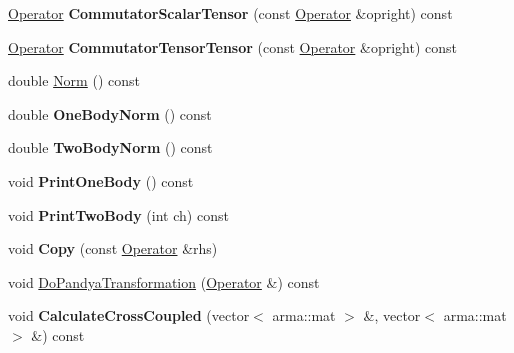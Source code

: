 \begin{DoxyCompactItemize}
\item 
\hypertarget{classOperator_aa6b5af6364735c97aa201851480375c7}{\hyperlink{classOperator}{Operator} {\bfseries Commutator\-Scalar\-Tensor} (const \hyperlink{classOperator}{Operator} \&opright) const }\label{classOperator_aa6b5af6364735c97aa201851480375c7}

\item 
\hypertarget{classOperator_ab5a2d58468b9f4a9f551613f5ce36fd1}{\hyperlink{classOperator}{Operator} {\bfseries Commutator\-Tensor\-Tensor} (const \hyperlink{classOperator}{Operator} \&opright) const }\label{classOperator_ab5a2d58468b9f4a9f551613f5ce36fd1}

\item 
double \hyperlink{classOperator_acb9d7959232a636191b91f6bf5b7b0c8}{Norm} () const 
\item 
\hypertarget{classOperator_a72dc7aea85c7775097d235de6f17f330}{double {\bfseries One\-Body\-Norm} () const }\label{classOperator_a72dc7aea85c7775097d235de6f17f330}

\item 
\hypertarget{classOperator_af1c40bdef64ec9abd5d95e8328565a67}{double {\bfseries Two\-Body\-Norm} () const }\label{classOperator_af1c40bdef64ec9abd5d95e8328565a67}

\item 
\hypertarget{classOperator_a5ec5a8110337108ac31d3af7337e454b}{void {\bfseries Print\-One\-Body} () const }\label{classOperator_a5ec5a8110337108ac31d3af7337e454b}

\item 
\hypertarget{classOperator_a905e42cefafaca0eb155cf41b3cd37b8}{void {\bfseries Print\-Two\-Body} (int ch) const }\label{classOperator_a905e42cefafaca0eb155cf41b3cd37b8}

\item 
\hypertarget{classOperator_a851708e76dd24603d0527f6c5c1bd544}{void {\bfseries Copy} (const \hyperlink{classOperator}{Operator} \&rhs)}\label{classOperator_a851708e76dd24603d0527f6c5c1bd544}

\item 
void \hyperlink{classOperator_a70139e405d99a645f57c37ccd2294c75}{Do\-Pandya\-Transformation} (\hyperlink{classOperator}{Operator} \&) const 
\item 
\hypertarget{classOperator_a4b36a16fac41d3465e9303960c3509f4}{void {\bfseries Calculate\-Cross\-Coupled} (vector$<$ arma\-::mat $>$ \&, vector$<$ arma\-::mat $>$ \&) const }\label{classOperator_a4b36a16fac41d3465e9303960c3509f4}


\end{DoxyCompactItemize}
